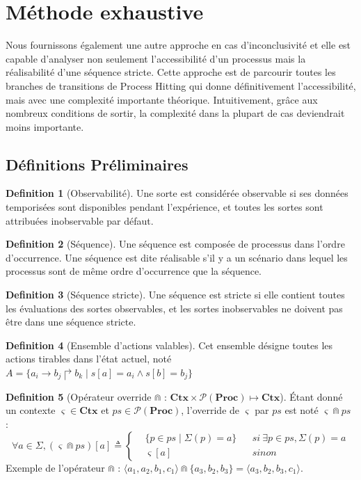 \documentclass[11pt]{report}
\theoremstyle{definition}
\newtheorem{Def}{Definition}[chapter]
\newcommand{\acm}[3]{#1\to#2\Rsh#3}
\begin{document}
\section{M\'ethode exhaustive}
Nous fournissons \'egalement une autre approche en cas d'inconclusivit\'e et elle est capable d'analyser non seulement l'accessibilit\'e d'un processus mais la r\'ealisabilit\'e d'une s\'equence stricte. Cette approche est de parcourir toutes les branches de transitions de Process Hitting qui donne d\'efinitivement l'accessibilit\'e, mais avec une complexit\'e importante th\'eorique. Intuitivement, gr\^ace aux nombreux conditions de sortir, la complexit\'e dans la plupart de cas deviendrait moins importante.
\subsection{D\'efinitions Pr\'eliminaires}
\begin{Def}[Observabilit\'e]
Une sorte est consid\'er\'ee observable si ses donn\'ees temporis\'ees sont disponibles pendant l'exp\'erience, et toutes les sortes sont attribu\'ees inobservable par d\'efaut.
\end{Def}
\begin{Def}[S\'equence]
Une s\'equence est compos\'ee de processus dans l'ordre d'occurrence. Une s\'equence est dite r\'ealisable s'il y a un sc\'enario dans lequel les processus sont de m\^eme ordre d'occurrence que la s\'equence.
\end{Def}
\begin{Def}[S\'equence stricte]
Une s\'equence est stricte si elle contient toutes les \'evaluations des sortes observables, et les sortes inobservables ne doivent pas \^etre dans une s\'equence stricte.
\end{Def}
\begin{Def}[Ensemble d'actions valables]
Cet ensemble d\'esigne toutes les actions tirables dans l'\'etat actuel, not\'e $A=\{\acm{a_i}{b_j}{b_k}\mid s[a]=a_i\land s[b]=b_j\}$
\end{Def}
\begin{Def}[Op\'erateur override $\Cap$ : $\mathbf{Ctx\times\mathcal{P}(Proc)\mapsto Ctx}$]
\'Etant donn\'e un contexte $\varsigma\in\mathbf{Ctx}$ et $ps\in\mathcal{P}(\mathbf{Proc})$, l'override de $\varsigma$ par $ps$ est not\'e $\varsigma\Cap ps$ :
\begin{equation}
\forall a \in\Sigma,(\varsigma\Cap ps)[a]\triangleq
\left\{
\begin{aligned}
&\{p\in ps\mid \Sigma(p)=a\}&&si\ \exists p\in ps,\Sigma(p)=a\\
&\varsigma[a]&&sinon
\end{aligned}
\right.
\nonumber
\end{equation} 
Exemple de l'op\'erateur $\Cap$ : $\langle a_1,a_2,b_1,c_1\rangle\Cap\{a_3,b_2,b_3\}=\langle a_3,b_2,b_3,c_1\rangle$.
\end{Def}
\end{document}
